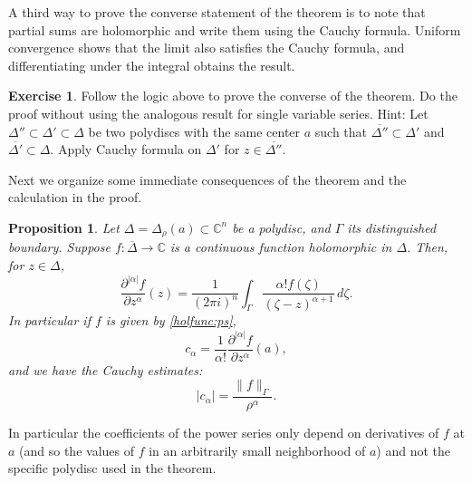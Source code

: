 \documentclass[12pt,openany]{book}
\newcommand{\sabs}[1]{\lvert {#1} \rvert}
\newcommand{\snorm}[1]{\lVert {#1} \rVert}
\newcommand{\abs}[1]{\left\lvert {#1} \right\rvert}
\newcommand{\C}{{\mathbb{C}}}
\newcommand{\myindex}[1]{#1\index{#1}}
\theoremstyle{plain}
\newtheorem{prop}[thm]{Proposition}
\theoremstyle{remark}
\theoremstyle{definition}
\newenvironment{exbox}{%
    \def\FrameCommand{\vrule width 1pt \relax\hspace {10pt}}%
    \MakeFramed {\advance \hsize -\width \FrameRestore }%
}{%
    \endMakeFramed
}
\theoremstyle{exercise}
\newtheorem{exercise}{Exercise}[section]
\theoremstyle{example}
\begin{document}
A third way to prove the converse statement of the theorem
is to note that partial sums are
holomorphic and write them using the Cauchy formula.  Uniform
convergence shows that the limit also satisfies the Cauchy formula, and
differentiating under the integral obtains the result.

\begin{exbox}
\begin{exercise}
Follow the logic above to prove the converse of the
theorem.
Do the proof without using the analogous result for single variable series.
Hint:
Let
$\Delta'' \subset \Delta' \subset \Delta$
be two polydiscs with the same center $a$
such that $\overline{\Delta''} \subset \Delta'$
and $\overline{\Delta'} \subset \Delta$.
Apply Cauchy formula on $\Delta'$
for $z \in \overline{\Delta''}$.
\end{exercise}
\end{exbox}

\pagebreak[2]
Next we organize some immediate consequences of the theorem
and the calculation in the proof.

\pagebreak[2]
\begin{prop}
Let $\Delta = \Delta_\rho(a) \subset \C^n$ be a polydisc,
and $\Gamma$ its distinguished boundary.
Suppose
$f \colon \overline{\Delta} \to \C$ is a continuous function
holomorphic in $\Delta$.
Then, for $z \in \Delta$,
\begin{equation*}
\frac{\partial^{\sabs{\alpha}}f}{\partial z^\alpha} (z) =
\frac{1}{{(2\pi i)}^n}
\int_{\Gamma}
\frac{\alpha! f(\zeta)}{{(\zeta-z)}^{\alpha+1}}
\,
d \zeta .
\end{equation*}
In particular if $f$ is given by \eqref{holfunc:ps}, 
\begin{equation*}
c_\alpha = \frac{1}{\alpha!} \frac{\partial^{\sabs{\alpha}}f}{\partial
z^\alpha} (a),
\end{equation*}
\nopagebreak
and we have the \emph{\myindex{Cauchy estimates}}:
\begin{equation*}
\abs{c_\alpha} = \frac{\snorm{f}_\Gamma}{\rho^\alpha} .
\end{equation*}
\end{prop}

In particular the coefficients of the power series only depend on
derivatives of $f$ at $a$ (and so the values of $f$ in an arbitrarily small
neighborhood of $a$) and not the specific polydisc used in the theorem.
\end{document}
